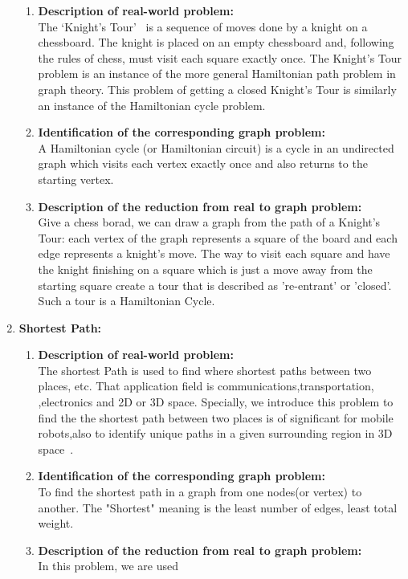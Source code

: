 \documentclass[article, 10pt,onecolumn]{article}
\begin{document}
\begin{enumerate}
\begin{enumerate}
	\item  \textbf{Description of real-world problem:}\\
    The `Knight's Tour'~\cite{knight} is a sequence of moves done by a knight on a chessboard. The knight is placed on an empty chessboard
    and, following the rules of chess, must visit each square exactly once. The Knight's Tour problem is an instance of the more general
    Hamiltonian path problem in graph theory. This problem of getting a closed Knight's Tour is similarly an instance of the Hamiltonian
    cycle problem.
   \item \textbf{Identification of the corresponding graph problem:}\\
    A Hamiltonian cycle (or Hamiltonian circuit) is a cycle in an undirected graph which visits each vertex exactly once and also returns to the starting vertex.
   \item \textbf{Description of the reduction from real to graph problem:}\\
    Give a chess borad, we can draw a graph from the path of a Knight's Tour: each vertex of the graph represents a square of the board and each edge represents a knight's move. The way to visit each square and have the knight finishing on a square which is just a move away from the starting square create a tour that is described as 're-entrant' or 'closed'. Such a tour is a Hamiltonian Cycle.
  \end{enumerate}  
\item \textbf{Shortest Path:} 
\begin{enumerate}   
   \item \textbf{Description of real-world problem:}\\
    The shortest Path is used to find where shortest paths between two places, etc. That application field is communications,transportation,
    ,electronics and 2D or 3D space. Specially, we introduce this problem to find the the shortest path between two places is of significant
    for mobile robots,also to identify unique paths in a given surrounding region in 3D space~\cite{Mobile}.
   \item \textbf{Identification of the corresponding graph problem:}\\
    To find the shortest path in a graph from one nodes(or vertex) to another. The "Shortest" meaning is the least number of edges, least
    total weight.    
   \item \textbf{Description of the reduction from real to graph problem:}\\
    In this problem, we are used 
   

\end{enumerate}
\end{enumerate}
\end{document}
